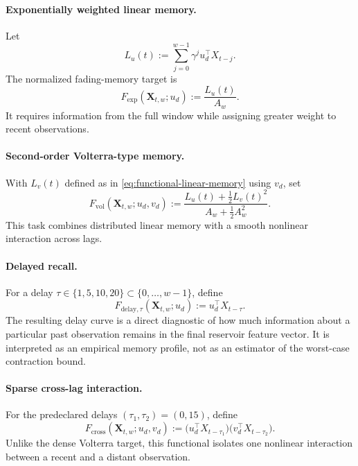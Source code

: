 \paragraph{Exponentially weighted linear memory.}
Let
\begin{equation}
    L_u(t)
    :=\sum_{j=0}^{w-1}\gamma^j u_d^\top X_{t-j}.
    \label{eq:functional-linear-memory}
\end{equation}
The normalized fading-memory target is
\begin{equation}
    F_{\mathrm{exp}}(\bm X_{t,w};u_d)
    :=\frac{L_u(t)}{A_w}.
    \label{eq:functional-exp}
\end{equation}
It requires information from the full window while assigning greater weight to
recent observations.

\paragraph{Second-order Volterra-type memory.}
With \(L_v(t)\) defined as in \cref{eq:functional-linear-memory} using \(v_d\),
set
\begin{equation}
    F_{\mathrm{vol}}(\bm X_{t,w};u_d,v_d)
    :=
    \frac{L_u(t)+\tfrac12 L_v(t)^2}
         {A_w+\tfrac12 A_w^2}.
    \label{eq:functional-volterra}
\end{equation}
This task combines distributed linear memory with a smooth nonlinear
interaction across lags.

\paragraph{Delayed recall.}
For a delay \(\tau\in\{1,5,10,20\}\subset\{0,\ldots,w-1\}\), define
\begin{equation}
    F_{\mathrm{delay},\tau}(\bm X_{t,w};u_d)
    :=u_d^\top X_{t-\tau}.
    \label{eq:functional-delay}
\end{equation}
The resulting delay curve is a direct diagnostic of how much information about
a particular past observation remains in the final reservoir feature vector.
It is interpreted as an empirical memory profile, not as an estimator of the
worst-case contraction bound.

\paragraph{Sparse cross-lag interaction.}
For the predeclared delays \((\tau_1,\tau_2)=(0,15)\), define
\begin{equation}
    F_{\mathrm{cross}}(\bm X_{t,w};u_d,v_d)
    :=
    \bigl(u_d^\top X_{t-\tau_1}\bigr)
    \bigl(v_d^\top X_{t-\tau_2}\bigr).
    \label{eq:functional-cross}
\end{equation}
Unlike the dense Volterra target, this functional isolates one nonlinear
interaction between a recent and a distant observation.

